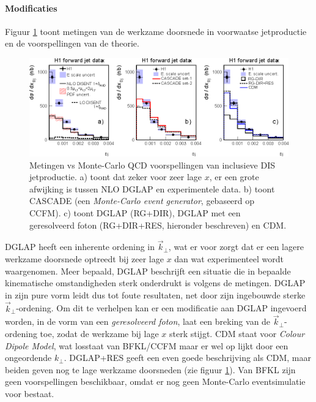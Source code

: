 \documentclass[a4paper,11pt]{article}
\numberwithin{equation}{section} %
\begin{document}
       \paragraph{Modificaties}
Figuur \ref{fig:HERAJets1} toont metingen van de werkzame doorsnede in voorwaatse jetproductie en de voorspellingen van de theorie.
\begin{figure} [H]
  \begin{center}
    \includegraphics[scale=1]{Afbeeldingen/HERAJets1.eps}
    \caption{Metingen vs Monte-Carlo QCD voorspellingen van inclusieve DIS jetproductie. a) toont dat zeker voor zeer lage $x$, er een grote afwijking is tussen NLO DGLAP en experimentele data. b) toont CASCADE  (een \textit{Monte-Carlo event generator}, gebaseerd op CCFM). c) toont DGLAP (RG+DIR), DGLAP met een geresolveerd foton (RG+DIR+RES, hieronder beschreven) en CDM. \cite{Kiesling}}
   \label{fig:HERAJets1}
  \end{center}
\end{figure}
DGLAP heeft een inherente ordening in $\vec{k}_\perp$, wat er voor zorgt dat er een lagere werkzame doorsnede optreedt bij zeer lage $x$ dan wat experimenteel wordt waargenomen.
Meer bepaald, DGLAP beschrijft een situatie die in bepaalde kinematische omstandigheden \cite[sectie 3.2]{Kiesling} sterk onderdrukt is volgens de metingen.
DGLAP in zijn pure vorm leidt dus tot foute resultaten, net door zijn ingebouwde sterke $\vec{k}_\perp$-ordening.
Om dit te verhelpen kan er een modificatie aan DGLAP ingevoerd worden, in de vorm van een \textit{geresolveerd foton}, laat een breking van de $\vec{k}_\perp$-ordening toe, zodat de werkzame bij lage $x$ sterk stijgt.
CDM staat voor \textit{Colour Dipole Model}, wat losstaat van BFKL/CCFM maar er wel op lijkt door een ongeordende $k_\perp$.
DGLAP+RES geeft een even goede beschrijving als CDM, maar beiden geven nog te lage werkzame doorsneden (zie figuur \ref{fig:HERAJets1}).
Van BFKL zijn geen voorspellingen beschikbaar, omdat er nog geen Monte-Carlo eventsimulatie voor bestaat.
\end{document}
